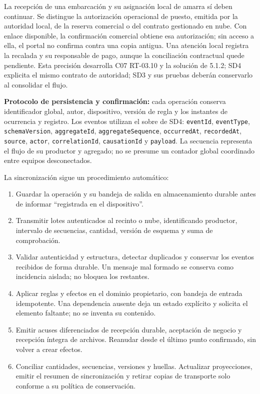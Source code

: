 La recepción de una embarcación y su asignación local de amarra sí deben continuar. Se distingue la autorización operacional de puesto, emitida por la autoridad local, de la reserva comercial o del contrato gestionado en nube. Con enlace disponible, la confirmación comercial obtiene esa autorización; sin acceso a ella, el portal no confirma contra una copia antigua. Una atención local registra la recalada y su responsable de pago, aunque la conciliación contractual quede pendiente. Esta precisión desarrolla C07 RT-03.10 y la solución de 5.1.2; SD4 explicita el mismo contrato de autoridad; SD3 y sus pruebas deberán conservarlo al consolidar el flujo.

\textbf{Protocolo de persistencia y confirmación:} cada operación conserva identificador global, autor, dispositivo, versión de regla y los instantes de ocurrencia y registro. Los eventos utilizan el sobre de SD4: \texttt{eventId}, \texttt{eventType}, \texttt{schemaVersion}, \texttt{aggregateId}, \texttt{aggregateSequence}, \texttt{occurredAt}, \texttt{recordedAt}, \texttt{source}, \texttt{actor}, \texttt{correlationId}, \texttt{causationId} y \texttt{payload}. La secuencia representa el flujo de su productor y agregado; no se presume un contador global coordinado entre equipos desconectados.

La sincronización sigue un procedimiento automático:
\begin{enumerate}
\item Guardar la operación y su bandeja de salida en almacenamiento durable antes de informar ``registrada en el dispositivo''.
\item Transmitir lotes autenticados al recinto o nube, identificando productor, intervalo de secuencias, cantidad, versión de esquema y suma de comprobación.
\item Validar autenticidad y estructura, detectar duplicados y conservar los eventos recibidos de forma durable. Un mensaje mal formado se conserva como incidencia aislada; no bloquea los restantes.
\item Aplicar reglas y efectos en el dominio propietario, con bandeja de entrada idempotente. Una dependencia ausente deja un estado explícito y solicita el elemento faltante; no se inventa su contenido.
\item Emitir acuses diferenciados de recepción durable, aceptación de negocio y recepción íntegra de archivos. Reanudar desde el último punto confirmado, sin volver a crear efectos.
\item Conciliar cantidades, secuencias, versiones y huellas. Actualizar proyecciones, emitir el resumen de sincronización y retirar copias de transporte solo conforme a su política de conservación.
\end{enumerate}

